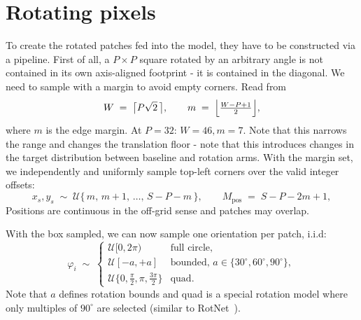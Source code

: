 \documentclass[final_report.tex]{subfiles}
\begin{document}
\section{Rotating pixels}\label{sec:rotating-pixels}
To create the rotated patches fed into the model, they have to be constructed via a pipeline. First of all, a $P\times P$ square rotated by an arbitrary angle is not contained in its own axis-aligned footprint - it is contained in the diagonal. We need to sample with a margin to avoid empty corners. Read from
\begin{equation}\label{eq:rot-window}
  W \;=\; \bigl\lceil P\sqrt{2} \,\bigr\rceil,
  \qquad
  m \;=\; \Bigl\lfloor \tfrac{W - P + 1}{2} \Bigr\rfloor ,
\end{equation}
where $m$ is the edge margin. At $P=32$: $W=46,m=7$. Note that this narrows the range and changes the translation floor - note that this introduces changes in the target distribution between baseline and rotation arms. With the margin set, we independently and uniformly sample top-left corners over the valid integer offsets:
\begin{equation}\label{eq:box-sampling}
  x_s, y_s \;\sim\; \mathcal{U}\{\,m,\, m+1,\, \dots,\, S - P - m\,\},
  \qquad
  M_{\text{pos}} \;=\; S - P - 2m + 1 ,
\end{equation}
Positions are continuous in the off-grid sense and patches may overlap.

With the box sampled, we can now sample one orientation per patch, i.i.d:
\begin{equation}\label{eq:angle-sampling}
  \varphi_i \;\sim\;
  \begin{cases}
    \mathcal{U}[0, 2\pi) & \text{full circle},\\
    \mathcal{U}[-a, +a] & \text{bounded, } a \in \{30^\circ, 60^\circ, 90^\circ\},\\
    \mathcal{U}\{0, \tfrac{\pi}{2}, \pi, \tfrac{3\pi}{2}\} & \text{quad}.
  \end{cases}
\end{equation}
Note that $a$ defines rotation bounds and quad is a special rotation model where only multiples of $90^\circ$ are selected (similar to RotNet~\cite{rotnet}).
\end{document}
